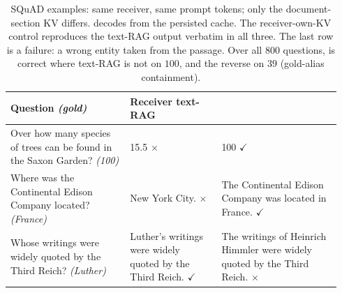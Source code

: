 \begin{table}[t]
\centering\scriptsize
\caption{SQuAD examples: same receiver, same prompt tokens; only the document-section KV differs.
\sys{} decodes from the persisted cache. The receiver-own-KV control reproduces the text-RAG
output verbatim in all three. The last row is a failure: a wrong entity taken from the passage.
Over all $800$ questions, \sys{} is correct where text-RAG is not on $100$, and the reverse on
$39$ (gold-alias containment).}
\label{tab:examples}
\begin{tabular}{@{}p{0.34\linewidth}p{0.26\linewidth}p{0.34\linewidth}@{}}
\toprule
Question \emph{(gold)} & Receiver text-RAG & \sys{} \\
\midrule
Over how many species of trees can be found in the Saxon Garden? \emph{(100)}
  & 15.5 \hfill $\times$ & 100 \hfill $\checkmark$ \\
Where was the Continental Edison Company located? \emph{(France)}
  & New York City. \hfill $\times$
  & The Continental Edison Company was located in France. \hfill $\checkmark$ \\
Whose writings were widely quoted by the Third Reich? \emph{(Luther)}
  & Luther's writings were widely quoted by the Third Reich. \hfill $\checkmark$
  & The writings of Heinrich Himmler were widely quoted by the Third Reich. \hfill $\times$ \\
\bottomrule
\end{tabular}
\end{table}
